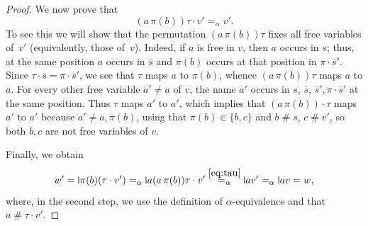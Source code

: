 \documentclass[10pt,a4paper]{amsart}
\newcommand{\midmid}{\hspace{0.2ex}{\rule[-0.1ex]{0.6pt}{1.65ex}}\hspace{0.2ex}}
\newcommand{\newletter}[1]{{\midmid}#1}
\numberwithin{equation}{section}
\newcommand{\ol}{\overline}
\newcommand{\+}[1]{\mathcal{#1}\xspace}
\newcommand{\fresh}{\mathbin{\#}}
\theoremstyle{definition}
\begin{document}
\begin{proof}
  We now prove that
  \begin{equation}\label{eq:tau}
    (a\, \pi(b))\tau\cdot v' =_\alpha v'.
  \end{equation}
  To see this we will show that the permutation
  $(a\, \pi(b))\tau$ fixes all free variables of~$v'$ (equivalently,
  those of~$v$). Indeed, if $a$ is free in $v$, then $a$ occurs in $s$; thus,
  at the same position $a$ occurs in $\ol{s}$ and $\pi(b)$ occurs at
  that position in $\pi\cdot \ol{s}'$. Since $\tau \cdot \ol s = \pi
  \cdot \ol{s}'$, we see that $\tau$ maps $a$ to $\pi(b)$, whence 
  $(a\, \pi(b))\tau$ maps $a$ to $a$. For every other free variable
  $a'\neq a$ of $v$, the name $a'$ occurs in $s$, $\ol{s}$,
  $\ol{s}', \pi\cdot \ol{s}'$ at the same position. Thus
  $\tau$ maps $a'$ to $a'$, which implies that $(a\, \pi(b))\cdot \tau$ maps
  $a'$ to $a'$ because $a'\neq a,\pi(b)$, using that
  $\pi(b)\in \{b,c\}$ and $b\fresh s$, $c\fresh v'$, so both $b,c$ are
  not free variables of $v$.

  Finally, we obtain 
  \[
    w'
    =
    \newletter \pi(b)(\tau\cdot v')
    =_\alpha
    \newletter a(a\, \pi(b))\tau\cdot v'
    \overset{\eqref{eq:tau}}{=_\alpha}
    \newletter av'
    =_\alpha
    \newletter av
    = w,
  \]
  where, in the second step, we use the definition of $\alpha$-equivalence
  and that $a\fresh \tau\cdot v'$. 
\end{proof}
\end{document}
